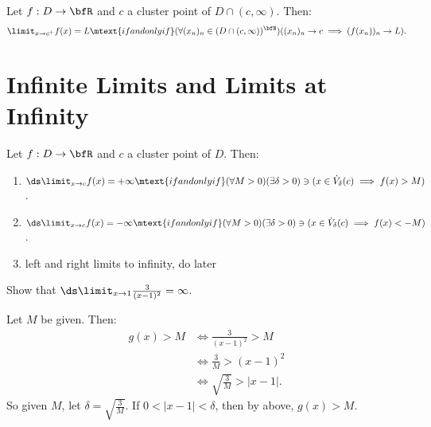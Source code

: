     \begin{proposition}
        Let $f:D \rightarrow \bfR$ and $c$ a cluster point of $D \cap (c,\infty)$. Then:
            \begin{equation*}
            \begin{split}
                \limit_{x \rightarrow c^+}f(x) = L \mtext{if and only if} (\forall (x_n)_n \in (D \cap (c,\infty))^\bfN)((x_n)_n \rightarrow c \implies (f(x_n))_n \rightarrow L).
            \end{split}
            \end{equation*}
    \end{proposition} 
\section{Infinite Limits and Limits at Infinity}
    \begin{definition}
        Let $f:D \rightarrow \bfR$ and $c$ a cluster point of $D$. Then:
        \begin{enumerate}[label = (\arabic*)]
            \item $\ds \limit_{x \rightarrow c}f(x) = +\infty \mtext{if and only if} (\forall M > 0)(\exists \delta > 0) \ni (x \in \dot{V}_\delta(c) \implies f(x) > M)$.
            \item $\ds \limit_{x \rightarrow c}f(x) = -\infty \mtext{if and only if} (\forall M > 0)(\exists \delta > 0) \ni (x \in \dot{V}_\delta(c) \implies f(x) < -M)$.
            \item {\color{red} left and right limits to infinity, do later}
        \end{enumerate}
    \end{definition}

    \begin{example}
        Show that $\ds \limit_{x \rightarrow 1} \frac{3}{(x-1)^2} = \infty$.
    \end{example}
        \begin{solution}
            Let $M$ be given. Then:
                \begin{equation*}
                \begin{split}
                    g(x) > M 
                    &\iff \frac{3}{(x-1)^2} > M \\
                    &\iff \frac{3}{M} > (x-1)^2 \\
                    &\iff \sqrt{\frac{3}{M}} > |x-1|.
                \end{split}
                \end{equation*}
            So given $M$, let $\delta = \sqrt{\frac{3}{M}}$. If $0 < |x-1| < \delta$, then by above, $g(x) > M$.
        \end{solution}

